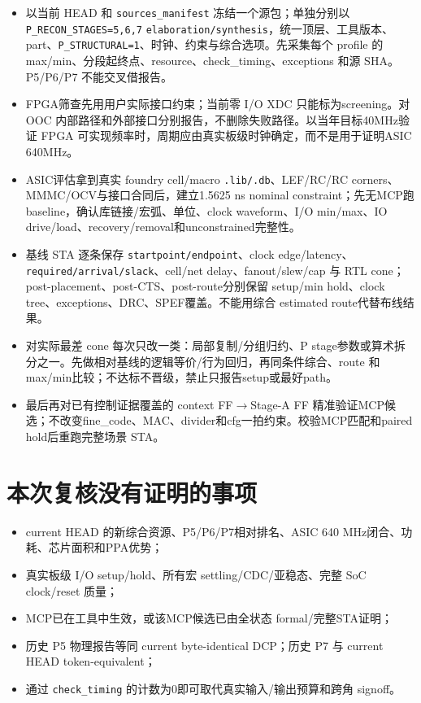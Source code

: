 \documentclass[UTF8,fontset=fandol,10pt,a4paper,openany]{ctexrep}
\newcommand{\code}[1]{\nolinkurl{#1}}
\begin{document}
\begin{itemize}
\item 以当前 HEAD 和 \code{sources_manifest} 冻结一个源包；单独分别以 \code{P_RECON_STAGES=5,6,7} \code{elaboration/synthesis}，统一顶层、工具版本、part、\code{P_STRUCTURAL=1}、时钟、约束与综合选项。先采集每个 profile 的 max/min、分段起终点、resource、check\_timing、exceptions 和源 SHA。P5/P6/P7 不能交叉借报告。
\item FPGA筛查先用用户实际接口约束；当前零 I/O XDC 只能标为screening。对 OOC 内部路径和外部接口分别报告，不删除失败路径。以当年目标40MHz验证 FPGA 可实现频率时，周期应由真实板级时钟确定，而不是用于证明ASIC 640MHz。
\item ASIC评估拿到真实 foundry cell/macro \code{.lib/.db}、LEF/RC/RC corners、MMMC/OCV与接口合同后，建立1.5625 ns nominal constraint；先无MCP跑baseline，确认库链接/宏弧、单位、clock waveform、I/O min/max、IO drive/load、recovery/removal和unconstrained完整性。
\item 基线 STA 逐条保存 \code{startpoint/endpoint}、clock edge/latency、\code{required/arrival/slack}、cell/net delay、fanout/slew/cap 与 RTL cone；post-placement、post-CTS、post-route分别保留 setup/min hold、clock tree、exceptions、DRC、SPEF覆盖。不能用综合 estimated route代替布线结果。
\item 对实际最差 cone 每次只改一类：局部复制/分组归约、P stage参数或算术拆分之一。先做相对基线的逻辑等价/行为回归，再同条件综合、route 和 max/min比较；不达标不晋级，禁止只报告setup或最好path。
\item 最后再对已有控制证据覆盖的 context FF\ensuremath{\rightarrow}Stage-A FF 精准验证MCP候选；不改变fine\_code、MAC、divider和cfg一拍约束。校验MCP匹配和paired hold后重跑完整场景 STA。
\end{itemize}


\section{本次复核没有证明的事项}


\begin{itemize}
\item current HEAD 的新综合资源、P5/P6/P7相对排名、ASIC 640 MHz闭合、功耗、芯片面积和PPA优势；
\item 真实板级 I/O setup/hold、所有宏 settling/CDC/亚稳态、完整 SoC clock/reset 质量；
\item MCP已在工具中生效，或该MCP候选已由全状态 formal/完整STA证明；
\item 历史 P5 物理报告等同 current byte-identical DCP；历史 P7 与 current HEAD token-equivalent；
\item 通过 \code{check_timing} 的计数为0即可取代真实输入/输出预算和跨角 signoff。
\end{itemize}
\end{document}
